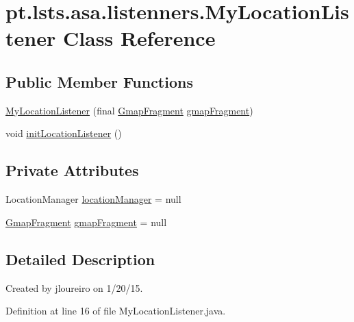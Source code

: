 \hypertarget{classpt_1_1lsts_1_1asa_1_1listenners_1_1MyLocationListener}{}\section{pt.\+lsts.\+asa.\+listenners.\+My\+Location\+Listener Class Reference}
\label{classpt_1_1lsts_1_1asa_1_1listenners_1_1MyLocationListener}
\subsection*{Public Member Functions}
\begin{DoxyCompactItemize}
\item 
\hyperlink{classpt_1_1lsts_1_1asa_1_1listenners_1_1MyLocationListener_a382e9a54b3e13a6e3ba86109ee8939de}{My\+Location\+Listener} (final \hyperlink{classpt_1_1lsts_1_1asa_1_1fragments_1_1GmapFragment}{Gmap\+Fragment} \hyperlink{classpt_1_1lsts_1_1asa_1_1listenners_1_1MyLocationListener_ace35f73344448e8a08a8c456c82de12d}{gmap\+Fragment})
\item 
void \hyperlink{classpt_1_1lsts_1_1asa_1_1listenners_1_1MyLocationListener_ab95e14042fb6008824808ec3396d142e}{init\+Location\+Listener} ()
\end{DoxyCompactItemize}
\subsection*{Private Attributes}
\begin{DoxyCompactItemize}
\item 
Location\+Manager \hyperlink{classpt_1_1lsts_1_1asa_1_1listenners_1_1MyLocationListener_a085b8eb27f3299f763e51c9241e95557}{location\+Manager} = null
\item 
\hyperlink{classpt_1_1lsts_1_1asa_1_1fragments_1_1GmapFragment}{Gmap\+Fragment} \hyperlink{classpt_1_1lsts_1_1asa_1_1listenners_1_1MyLocationListener_ace35f73344448e8a08a8c456c82de12d}{gmap\+Fragment} = null
\end{DoxyCompactItemize}


\subsection{Detailed Description}
Created by jloureiro on 1/20/15. 

Definition at line 16 of file My\+Location\+Listener.\+java.



